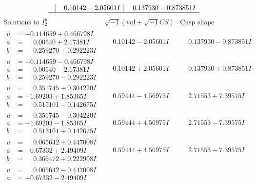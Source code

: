 \documentclass[1p]{elsarticle_modified}
\theoremstyle{definition}
\newcommand{\I}{\sqrt{-1}}
\begin{document}
$$\begin{array}{c|c|c}
 & \phantom{-}0.10142 - 2.05601 I & \phantom{-}0.137930 - 0.873851 I\\
 \hline 
 \end{array}$$\newpage$$\begin{array}{c|c|c}  
\text{Solutions to }I^u_{2}& \I (\text{vol} + \sqrt{-1}CS) & \text{Cusp shape}\\
 \hline 
\begin{aligned}
u &= -0.114659 + 0.466798 I \\
a &= \phantom{-}0.00540 + 2.17381 I \\
b &= \phantom{-}0.259270 + 0.292223 I\end{aligned}
 & \phantom{-}0.10142 - 2.05601 I & \phantom{-}0.137930 - 0.873851 I \\ \hline\begin{aligned}
u &= -0.114659 - 0.466798 I \\
a &= \phantom{-}0.00540 - 2.17381 I \\
b &= \phantom{-}0.259270 - 0.292223 I\end{aligned}
 & \phantom{-}0.10142 + 2.05601 I & \phantom{-}0.137930 + 0.873851 I \\ \hline\begin{aligned}
u &= \phantom{-}0.351745 + 0.304220 I \\
a &= -1.69203 + 1.85365 I \\
b &= \phantom{-}0.515101 - 0.142675 I\end{aligned}
 & \phantom{-}0.59444 - 4.56975 I & \phantom{-}2.71553 + 7.39575 I \\ \hline\begin{aligned}
u &= \phantom{-}0.351745 - 0.304220 I \\
a &= -1.69203 - 1.85365 I \\
b &= \phantom{-}0.515101 + 0.142675 I\end{aligned}
 & \phantom{-}0.59444 + 4.56975 I & \phantom{-}2.71553 - 7.39575 I \\ \hline\begin{aligned}
u &= \phantom{-}0.065642 + 0.447008 I \\
a &= -0.67332 + 2.49409 I \\
b &= \phantom{-}0.366472 + 0.222908 I\end{aligned}
 & \phantom{-}0.59444 + 4.56975 I & \phantom{-}2.71553 - 7.39575 I \\ \hline\begin{aligned}
u &= \phantom{-}0.065642 - 0.447008 I \\
a &= -0.67332 - 2.49409 I \\

\end{aligned}
\end{array}$$
\end{document}
